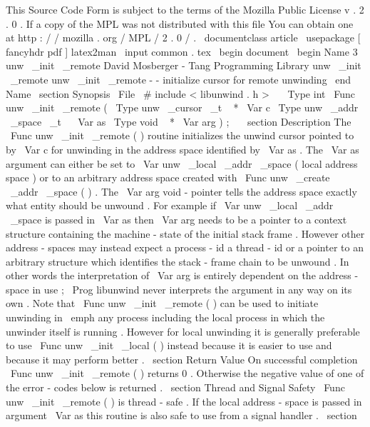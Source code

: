 %
This
Source
Code
Form
is
subject
to
the
terms
of
the
Mozilla
Public
%
License
v
.
2
.
0
.
If
a
copy
of
the
MPL
was
not
distributed
with
this
%
file
You
can
obtain
one
at
http
:
/
/
mozilla
.
org
/
MPL
/
2
.
0
/
.
\
documentclass
{
article
}
\
usepackage
[
fancyhdr
pdf
]
{
latex2man
}
\
input
{
common
.
tex
}
\
begin
{
document
}
\
begin
{
Name
}
{
3
}
{
unw
\
_init
\
_remote
}
{
David
Mosberger
-
Tang
}
{
Programming
Library
}
{
unw
\
_init
\
_remote
}
unw
\
_init
\
_remote
-
-
initialize
cursor
for
remote
unwinding
\
end
{
Name
}
\
section
{
Synopsis
}
\
File
{
\
#
include
<
libunwind
.
h
>
}
\
\
\
Type
{
int
}
\
Func
{
unw
\
_init
\
_remote
}
(
\
Type
{
unw
\
_cursor
\
_t
~
*
}
\
Var
{
c
}
\
Type
{
unw
\
_addr
\
_space
\
_t
~
}
\
Var
{
as
}
\
Type
{
void
~
*
}
\
Var
{
arg
}
)
;
\
\
\
section
{
Description
}
The
\
Func
{
unw
\
_init
\
_remote
}
(
)
routine
initializes
the
unwind
cursor
pointed
to
by
\
Var
{
c
}
for
unwinding
in
the
address
space
identified
by
\
Var
{
as
}
.
The
\
Var
{
as
}
argument
can
either
be
set
to
\
Var
{
unw
\
_local
\
_addr
\
_space
}
(
local
address
space
)
or
to
an
arbitrary
address
space
created
with
\
Func
{
unw
\
_create
\
_addr
\
_space
}
(
)
.
The
\
Var
{
arg
}
void
-
pointer
tells
the
address
space
exactly
what
entity
should
be
unwound
.
For
example
if
\
Var
{
unw
\
_local
\
_addr
\
_space
}
is
passed
in
\
Var
{
as
}
then
\
Var
{
arg
}
needs
to
be
a
pointer
to
a
context
structure
containing
the
machine
-
state
of
the
initial
stack
frame
.
However
other
address
-
spaces
may
instead
expect
a
process
-
id
a
thread
-
id
or
a
pointer
to
an
arbitrary
structure
which
identifies
the
stack
-
frame
chain
to
be
unwound
.
In
other
words
the
interpretation
of
\
Var
{
arg
}
is
entirely
dependent
on
the
address
-
space
in
use
;
\
Prog
{
libunwind
}
never
interprets
the
argument
in
any
way
on
its
own
.
Note
that
\
Func
{
unw
\
_init
\
_remote
}
(
)
can
be
used
to
initiate
unwinding
in
\
emph
{
any
}
process
including
the
local
process
in
which
the
unwinder
itself
is
running
.
However
for
local
unwinding
it
is
generally
preferable
to
use
\
Func
{
unw
\
_init
\
_local
}
(
)
instead
because
it
is
easier
to
use
and
because
it
may
perform
better
.
\
section
{
Return
Value
}
On
successful
completion
\
Func
{
unw
\
_init
\
_remote
}
(
)
returns
0
.
Otherwise
the
negative
value
of
one
of
the
error
-
codes
below
is
returned
.
\
section
{
Thread
and
Signal
Safety
}
\
Func
{
unw
\
_init
\
_remote
}
(
)
is
thread
-
safe
.
If
the
local
address
-
space
is
passed
in
argument
\
Var
{
as
}
this
routine
is
also
safe
to
use
from
a
signal
handler
.
\
section
